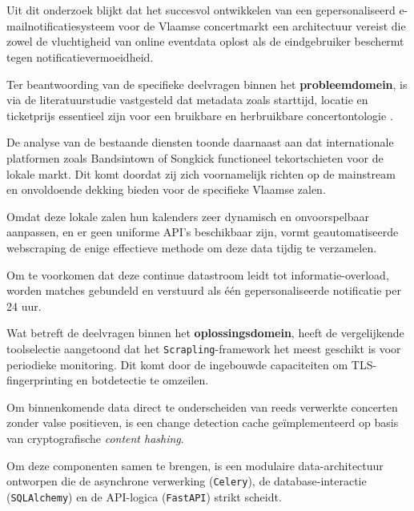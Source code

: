 
\chapter{}%
\label{ch:conclusie}

Uit dit onderzoek blijkt dat het succesvol 
ontwikkelen van een gepersonaliseerd 
e-mailnotificatiesysteem voor de Vlaamse 
concertmarkt een architectuur vereist die 
zowel de vluchtigheid van online eventdata 
oplost als de eindgebruiker beschermt 
tegen notificatievermoeidheid.

Ter beantwoording van de specifieke deelvragen 
binnen het \textbf{probleemdomein}, is via de 
literatuurstudie vastgesteld dat metadata 
zoals starttijd, locatie en ticketprijs 
essentieel zijn voor een bruikbare en 
herbruikbare concertontologie \autocite{Graves2003}. 

De analyse van de bestaande diensten toonde 
daarnaast aan dat internationale platformen 
zoals Bandsintown of Songkick functioneel 
tekortschieten voor de lokale markt. Dit komt 
doordat zij zich voornamelijk richten op de 
mainstream en onvoldoende dekking 
bieden voor de specifieke Vlaamse zalen. 

Omdat deze lokale zalen hun kalenders zeer 
dynamisch en onvoorspelbaar aanpassen, en er 
geen uniforme API's beschikbaar zijn, vormt 
geautomatiseerde webscraping de enige effectieve 
methode om deze data tijdig te verzamelen. 

Om te voorkomen dat deze continue datastroom 
leidt tot informatie-overload, worden 
matches gebundeld en verstuurd als
één gepersonaliseerde notificatie per 24 uur.

Wat betreft de deelvragen binnen het 
\textbf{oplossingsdomein}, heeft de vergelijkende 
toolselectie aangetoond dat het \texttt{Scrapling}-framework 
het meest geschikt is voor periodieke monitoring. 
Dit komt door de ingebouwde capaciteiten om 
TLS-fingerprinting en botdetectie te omzeilen. 

Om binnenkomende data direct te onderscheiden van 
reeds verwerkte concerten zonder valse positieven, 
is een change detection cache geïmplementeerd 
op basis van cryptografische \textit{content hashing}.

Om deze componenten samen te brengen, is een 
modulaire data-architectuur ontworpen die de 
asynchrone verwerking (\texttt{Celery}), de 
database-interactie (\texttt{SQLAlchemy}) en de 
API-logica (\texttt{FastAPI}) strikt scheidt. 

